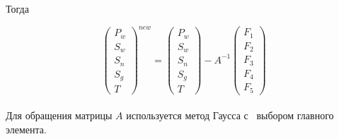 Тогда

\begin{equation}
\begin{pmatrix}
P_w\\
S_w\\
S_n\\
S_g\\
T
\end{pmatrix}^{new}
=
\begin{pmatrix}
P_w\\
S_w\\
S_n\\
S_g\\
T
\end{pmatrix}
-A^{-1}
\begin{pmatrix}
F_1\\
F_2\\
F_3\\
F_4\\
F_5
\end{pmatrix}
\end{equation}\\

Для обращения матрицы $A$ используется метод Гаусса с~ выбором
главного элемента\cite{Kalitkin}.
